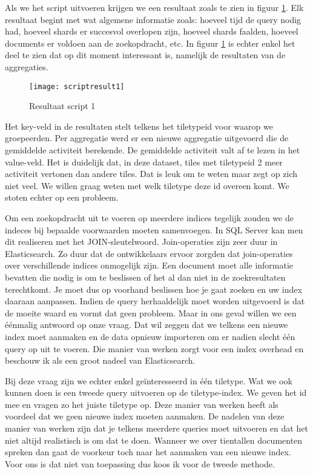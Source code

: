 Als we het script uitvoeren krijgen we een resultaat zoals te zien in figuur \ref{fig:scriptresult1}. Elk resultaat begint met wat algemene informatie zoals: hoeveel tijd de query nodig had, hoeveel shards er succesvol overlopen zijn, hoeveel shards faalden, hoeveel documents er voldoen aan de zoekopdracht, etc. In figuur \ref{fig:scriptresult1} is echter enkel het deel te zien dat op dit moment interessant is, namelijk de resultaten van de aggregaties.

\begin{figure}
	\centering
	\texttt{[image: scriptresult1]}
	\caption{Resultaat script 1}
	\label{fig:scriptresult1}
\end{figure}

Het key-veld in de resultaten stelt telkens het tiletypeid voor waarop we groepeerden. Per aggregatie werd er een nieuwe aggregatie uitgevoerd die de gemiddelde activiteit berekende. De gemiddelde activiteit valt af te lezen in het value-veld. Het is duidelijk dat, in deze dataset, tiles met tiletypeid 2 meer activiteit vertonen dan andere tiles. Dat is leuk om te weten maar zegt op zich niet veel. We willen graag weten met welk tiletype deze id overeen komt. We stoten echter op een probleem.

Om een zoekopdracht uit te voeren op meerdere indices tegelijk zouden we de indeces bij bepaalde voorwaarden moeten samenvoegen. In SQL Server kan men dit realiseren met het JOIN-sleutelwoord. Join-operaties zijn zeer duur in Elasticsearch. Zo duur dat de ontwikkelaars ervoor zorgden dat join-operaties over verschillende indices onmogelijk zijn. Een document moet alle informatie bevatten die nodig is om te beslissen of het al dan niet in de zoekresultaten terechtkomt. Je moet dus op voorhand beslissen hoe je gaat zoeken en uw index daaraan aanpassen. Indien de query herhaaldelijk moet worden uitgevoerd is dat de moeite waard en vormt dat geen probleem. Maar in ons geval willen we een éénmalig antwoord op onze vraag. Dat wil zeggen dat we telkens een nieuwe index moet aanmaken en de data opnieuw importeren om er nadien slecht één query op uit te voeren. Die manier van werken zorgt voor een index overhead en beschouw ik als een groot nadeel van Elasticsearch.

Bij deze vraag zijn we echter enkel geïnteresseerd in één tiletype. Wat we ook kunnen doen is een tweede query uitvoeren op de tiletype-index. We geven het id mee en vragen zo het juiste tiletype op. Deze manier van werken heeft als voordeel dat we geen nieuwe index moeten aanmaken. De nadelen van deze manier van werken zijn dat je telkens meerdere queries moet uitvoeren en dat het niet altijd realistisch is om dat te doen. Wanneer we over tientallen documenten spreken dan gaat de voorkeur toch naar het aanmaken van een nieuwe index. Voor ons is dat niet van toepassing dus koos ik voor de tweede methode.

